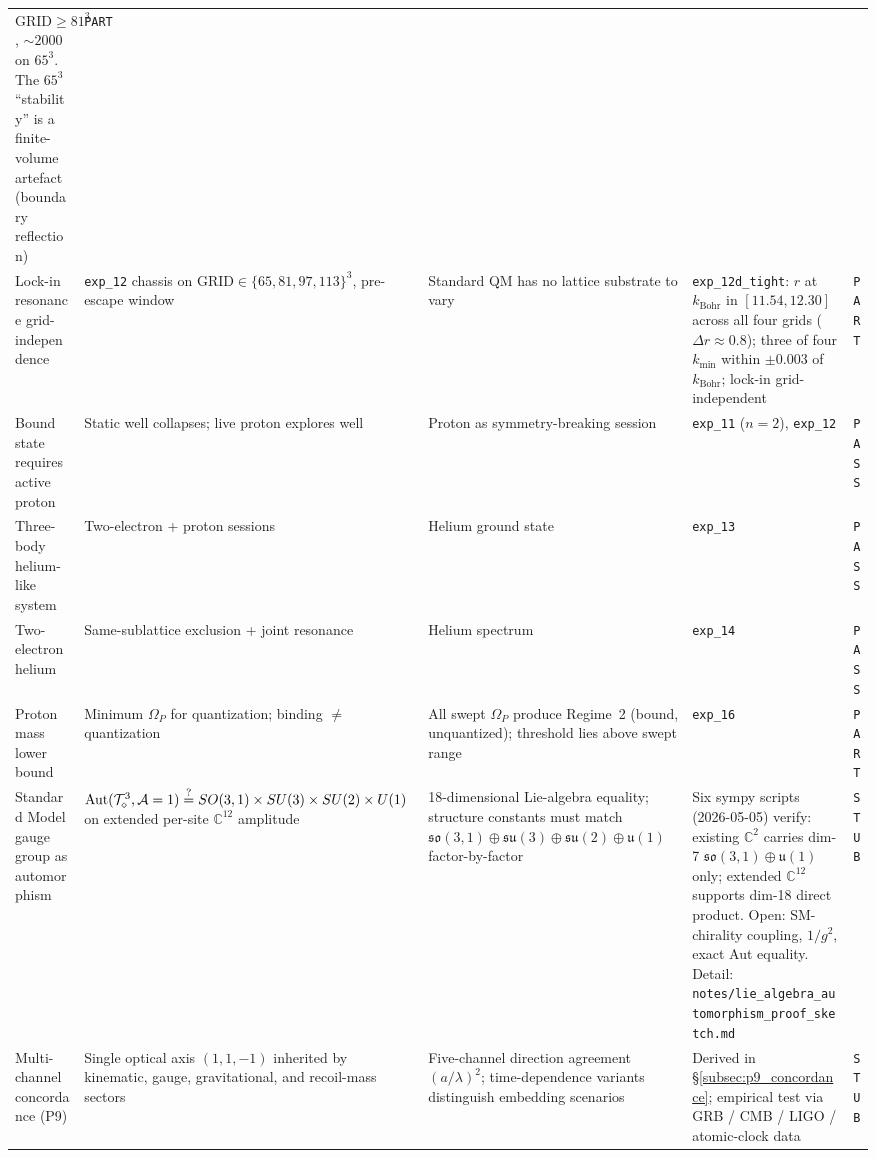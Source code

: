 {\begin{longtable}{@{}p{2.6cm}p{3.8cm}p{3.2cm}p{4.4cm}p{1.0cm}@{}}
      $\text{GRID}\!\geq\!81^3$, $\sim 2000$ on $65^3$.  The $65^3$
      ``stability'' is a finite-volume artefact (boundary reflection)
    & \texttt{PART} \\
Lock-in resonance grid-independence
    & \texttt{exp\_12} chassis on $\text{GRID} \in \{65, 81, 97,
      113\}^3$, pre-escape window
    & Standard QM has no lattice substrate to vary
    & \texttt{exp\_12d\_tight}: $r$ at $k_\text{Bohr}$ in
      $[11.54, 12.30]$ across all four grids
      ($\Delta r \approx 0.8$); three of four $k_\text{min}$ within
      $\pm 0.003$ of $k_\text{Bohr}$; lock-in grid-independent
    & \texttt{PART} \\
Bound state requires active proton
    & Static well collapses; live proton explores well
    & Proton as symmetry-breaking session
    & \texttt{exp\_11} ($n=2$), \texttt{exp\_12}
    & \texttt{PASS} \\
Three-body helium-like system
    & Two-electron + proton sessions
    & Helium ground state
    & \texttt{exp\_13}
    & \texttt{PASS} \\
Two-electron helium
    & Same-sublattice exclusion + joint resonance
    & Helium spectrum
    & \texttt{exp\_14}
    & \texttt{PASS} \\
Proton mass lower bound
    & Minimum $\Omega_P$ for quantization;
      binding $\neq$ quantization
    & All swept $\Omega_P$ produce Regime~2 (bound, unquantized);
      threshold lies above swept range
    & \texttt{exp\_16}
    & \texttt{PART} \\
Standard Model gauge group as automorphism
    & $\mathrm{Aut}(\mathcal{T}_\diamond^3, \mathcal{A}=1) \stackrel{?}{=}
      SO(3,1) \times SU(3) \times SU(2) \times U(1)$
      on extended per-site $\mathbb{C}^{12}$ amplitude
    & 18-dimensional Lie-algebra equality;
      structure constants must match
      $\mathfrak{so}(3,1) \oplus \mathfrak{su}(3) \oplus
      \mathfrak{su}(2) \oplus \mathfrak{u}(1)$ factor-by-factor
    & Six sympy scripts (2026-05-05) verify: existing
      $\mathbb{C}^2$ carries dim-7 $\mathfrak{so}(3,1) \oplus
      \mathfrak{u}(1)$ only; extended $\mathbb{C}^{12}$ supports
      dim-18 direct product.  Open: SM-chirality coupling, $1/g^2$,
      exact Aut equality.  Detail:
      \nolinkurl{notes/lie_algebra_automorphism_proof_sketch.md}
    & \texttt{STUB} \\
\hline
Multi-channel concordance (P9)
    & Single optical axis $(1,1,-1)$ inherited by kinematic,
      gauge, gravitational, and recoil-mass sectors
    & Five-channel direction agreement $(a/\lambda)^2$;
      time-dependence variants distinguish embedding scenarios
    & Derived in §\ref{subsec:p9_concordance};
      empirical test via GRB / CMB / LIGO / atomic-clock data
    & \texttt{STUB} \\
\hline
\end{longtable}
}
